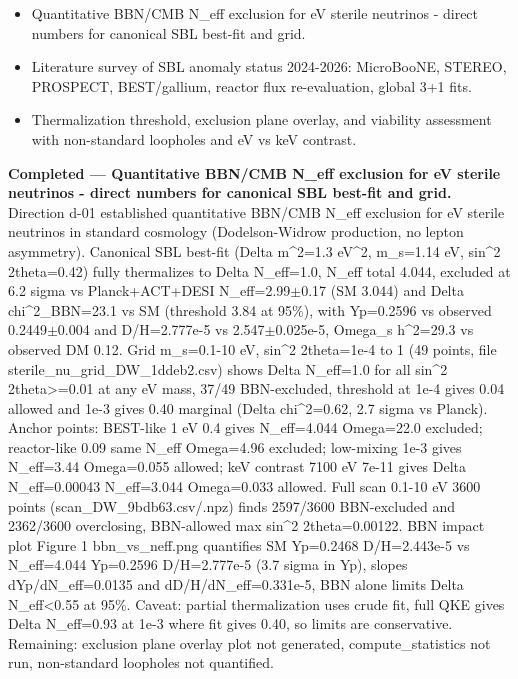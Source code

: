 \documentclass[11pt,a4paper]{article}
\begin{document}
\begin{itemize}
  \item Quantitative BBN/CMB N\_eff exclusion for eV sterile neutrinos - direct numbers for canonical SBL best-fit and grid.
  \item Literature survey of SBL anomaly status 2024-2026: MicroBooNE, STEREO, PROSPECT, BEST/gallium, reactor flux re-evaluation, global 3+1 fits.
  \item Thermalization threshold, exclusion plane overlay, and viability assessment with non-standard loopholes and eV vs keV contrast.
\end{itemize}
\textbf{Completed --- Quantitative BBN/CMB N\_eff exclusion for eV sterile neutrinos - direct numbers for canonical SBL best-fit and grid.} Direction d-01 established quantitative BBN/CMB N\_eff exclusion for eV sterile neutrinos in standard cosmology (Dodelson-Widrow production, no lepton asymmetry). Canonical SBL best-fit (Delta m\textasciicircum{}2=1.3 eV\textasciicircum{}2, m\_s=1.14 eV, sin\textasciicircum{}2 2theta=0.42) fully thermalizes to Delta N\_eff=1.0, N\_eff total 4.044, excluded at 6.2 sigma vs Planck+ACT+DESI N\_eff=2.99$\pm$0.17 (SM 3.044) and Delta chi\textasciicircum{}2\_BBN=23.1 vs SM (threshold 3.84 at 95\%), with Yp=0.2596 vs observed 0.2449$\pm$0.004 and D/H=2.777e-5 vs 2.547$\pm$0.025e-5, Omega\_s h\textasciicircum{}2=29.3 vs observed DM 0.12. Grid m\_s=0.1-10 eV, sin\textasciicircum{}2 2theta=1e-4 to 1 (49 points, file sterile\_nu\_grid\_DW\_1ddeb2.csv) shows Delta N\_eff=1.0 for all sin\textasciicircum{}2 2theta\textgreater{}=0.01 at any eV mass, 37/49 BBN-excluded, threshold at 1e-4 gives 0.04 allowed and 1e-3 gives 0.40 marginal (Delta chi\textasciicircum{}2=0.62, 2.7 sigma vs Planck). Anchor points: BEST-like 1 eV 0.4 gives N\_eff=4.044 Omega=22.0 excluded; reactor-like 0.09 same N\_eff Omega=4.96 excluded; low-mixing 1e-3 gives N\_eff=3.44 Omega=0.055 allowed; keV contrast 7100 eV 7e-11 gives Delta N\_eff=0.00043 N\_eff=3.044 Omega=0.033 allowed. Full scan 0.1-10 eV 3600 points (scan\_DW\_9bdb63.csv/.npz) finds 2597/3600 BBN-excluded and 2362/3600 overclosing, BBN-allowed max sin\textasciicircum{}2 2theta=0.00122. BBN impact plot Figure 1 bbn\_vs\_neff.png quantifies SM Yp=0.2468 D/H=2.443e-5 vs N\_eff=4.044 Yp=0.2596 D/H=2.777e-5 (3.7 sigma in Yp), slopes dYp/dN\_eff=0.0135 and dD/H/dN\_eff=0.331e-5, BBN alone limits Delta N\_eff\textless{}0.55 at 95\%. Caveat: partial thermalization uses crude fit, full QKE gives Delta N\_eff=0.93 at 1e-3 where fit gives 0.40, so limits are conservative. Remaining: exclusion plane overlay plot not generated, compute\_statistics not run, non-standard loopholes not quantified.
\end{document}
